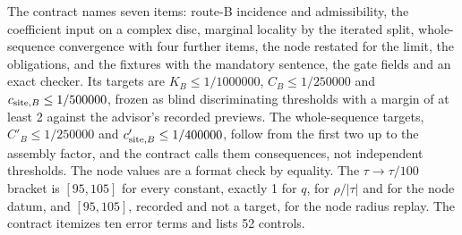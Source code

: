 The contract names seven items: route-B incidence and admissibility, the
coefficient input on a complex disc, marginal locality by the iterated split,
whole-sequence convergence with four further items, the node restated for
the limit, the obligations, and the fixtures with the mandatory sentence, the
gate fields and an exact checker. Its targets are $K_B\le1/1000000$,
$C_B\le1/250000$ and $c_{{\rm site},B}\le1/500000$, frozen as blind
discriminating thresholds with a margin of at least 2 against the advisor's
recorded previews. The whole-sequence targets, $C'_B\le1/250000$ and
$c'_{{\rm site},B}\le1/400000$, follow from the first two up to the assembly
factor, and the contract calls them consequences, not independent
thresholds. The node values are a format check by equality. The
$\tau\to\tau/100$ bracket is $[95,105]$ for every constant, exactly 1 for $q$,
for $\rho/|\tau|$ and for the node datum, and $[95,105]$, recorded and not a
target, for the node radius replay. The contract itemizes ten error terms and
lists 52 controls.

